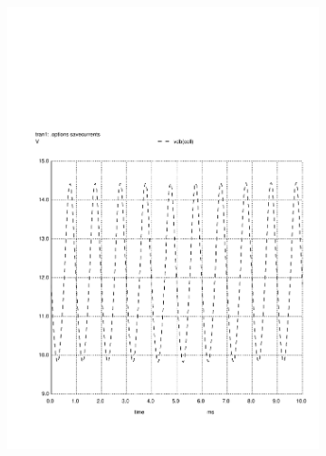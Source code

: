 \begin{figure}[h]
    \centering
    \begin{subfigure}{0.23\textwidth}
        \includegraphics[width=\linewidth, clip]{vo1.pdf}
        \label{fig:output1}
    \end{subfigure}
    \begin{subfigure}{0.23\textwidth}

\end{subfigure}
\end{figure}
